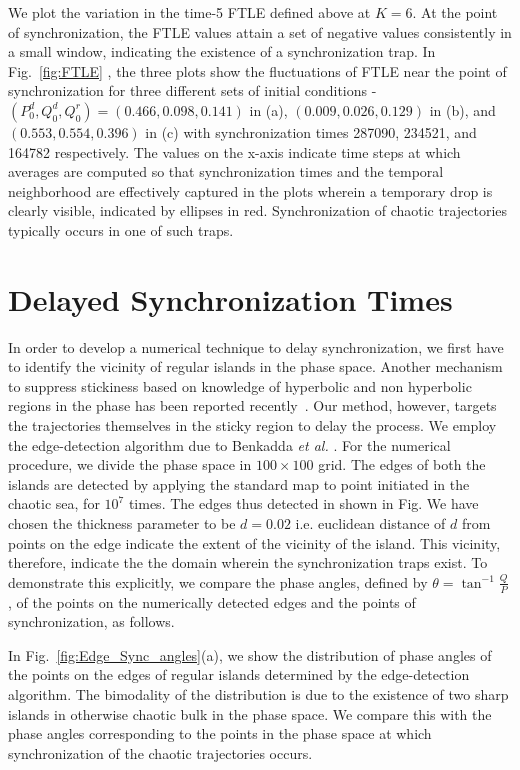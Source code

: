 \documentclass[reprint,superscriptaddress,amsmath,amssymb,aps,pre]{revtex4-1}
\begin{document}
We plot the variation in the time-5 FTLE defined above at $K = 6$. At the point of synchronization, the FTLE values attain a set of negative values consistently in a small window, indicating the existence of a synchronization trap.  In Fig.~\ref{fig:FTLE} , the three plots show the fluctuations  of FTLE near the point of synchronization for three different sets of initial conditions - $(P^d_0,Q^d_0,Q^r_0) = (0.466,0.098,0.141)$ in (a),  $(0.009,0.026,0.129)$ in (b), and $(0.553,0.554,0.396)$ in (c) with synchronization times 287090, 234521, and 164782 respectively. The values on the x-axis indicate time steps at which averages are computed so that synchronization times and the temporal neighborhood are effectively captured in the plots wherein a temporary drop is clearly visible, indicated by ellipses in red. Synchronization of chaotic trajectories typically occurs in one of such traps. 

\section{Delayed Synchronization Times}
\label{sec:delay}
In order to develop a numerical technique to delay synchronization, we  first have to identify the vicinity of regular islands in the phase space. Another mechanism  to suppress stickiness based on knowledge of hyperbolic and non hyperbolic regions in the phase has been reported recently~\cite{Kruger2015}. Our method, however, targets the trajectories themselves in the sticky region to delay the process. We employ the edge-detection algorithm due to Benkadda {\it et al.} \cite{Benkadda1997}. For the numerical procedure, we divide the phase space in $100 \times 100$ grid. The edges of both the islands are detected by applying the standard map to point initiated in the chaotic sea, for $10^7$ times.  The edges thus detected in shown in Fig.  We have chosen the thickness parameter to be $d = 0.02$ i.e. euclidean distance of $d$ from points on the edge indicate the extent of the vicinity of the island.  This vicinity, therefore, indicate the the domain wherein the synchronization traps exist.  To demonstrate this explicitly, we compare the phase angles, defined by $\theta = \tan^{-1}\frac{Q}{P}$, of the points on the numerically detected edges and the points of synchronization, as follows. 

In Fig.~\ref{fig:Edge_Sync_angles}(a), we show the distribution of phase angles of the points on the edges of regular islands determined by the edge-detection algorithm.  The bimodality of the distribution is due to the existence of two sharp islands in otherwise chaotic bulk in the phase space.  We compare this with the phase angles corresponding to the points in the phase space at which synchronization of the chaotic trajectories occurs.
\end{document}
